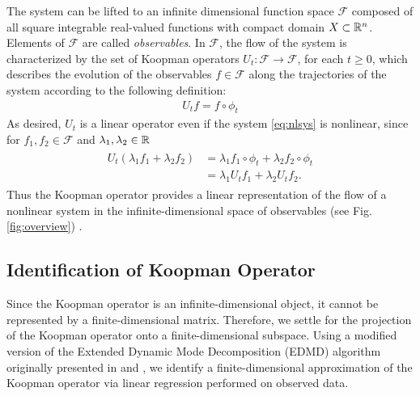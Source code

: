 The system can be lifted to an infinite dimensional function space $\mathcal{F}$ composed of all square integrable real-valued functions with compact domain $X \subset \mathbb{R}^n$.
Elements of $\mathcal{F}$ are called \emph{observables}.
In $\mathcal{F}$, the flow of the system is characterized by the set %
of Koopman operators 
$U_t : \mathcal{F} \to \mathcal{F}$, for each $t \geq 0$,
which describes the evolution of the observables ${f \in \mathcal{F}}$ along the trajectories of the system according to the following definition:
\begin{align}
    U_t f = f \circ \phi_t      
    \label{eq:koopman}
\end{align}
As desired, $U_t$ is a linear operator even if the system \eqref{eq:nlsys} is nonlinear, since for $f_1, f_2 \in \mathcal{F}$ and $\lambda_1, \lambda_2 \in \mathbb{R}$
\begin{align}
    \begin{split}
    U_t (\lambda_1 f_1 + \lambda_2 f_2) &= \lambda_1 f_1 \circ \phi_t + \lambda_2 f_2 \circ \phi_t \\
    &= \lambda_1 U_t f_1 + \lambda_2 U_t f_2.
    \end{split}
\end{align}
Thus the Koopman operator provides a linear representation of the flow of a nonlinear system in the infinite-dimensional space of observables (see Fig. \ref{fig:overview}) \cite{budivsic2012applied} .


\subsection{Identification of Koopman Operator}
\label{sec:koopid}

Since the Koopman operator is an infinite-dimensional object, it cannot be represented by a finite-dimensional matrix. 
Therefore, we settle for the projection of the Koopman operator onto a finite-dimensional subspace.
Using a modified version of the Extended Dynamic Mode Decomposition (EDMD) algorithm \cite{williams2015data} originally presented in \cite{mauroy2016linear} and \cite{mauroy2017koopman}, we identify a finite-dimensional approximation of the Koopman operator via linear regression performed on observed data.

